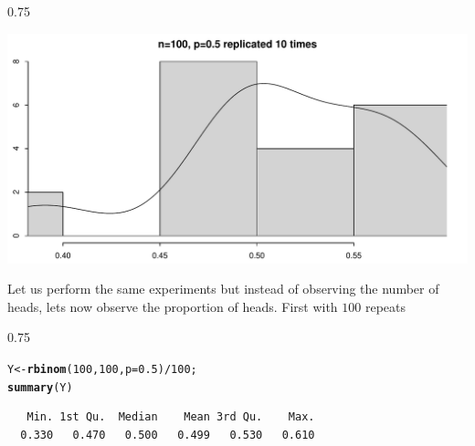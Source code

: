 \documentclass{beamer}\usepackage[]{graphicx}\usepackage[]{color}
\makeatletter
\newcommand{\hlnum}[1]{\textcolor[rgb]{0.2,0.2,0.2}{#1}}%
\newcommand{\hlopt}[1]{\textcolor[rgb]{0.102,0.102,0.102}{#1}}%
\newcommand{\hlstd}[1]{\textcolor[rgb]{0.102,0.102,0.102}{#1}}%
\newcommand{\hlkwb}[1]{\textcolor[rgb]{0.102,0.102,0.102}{#1}}%
\newcommand{\hlkwc}[1]{\textcolor[rgb]{0.2,0.2,0.2}{#1}}%
\newcommand{\hlkwd}[1]{\textcolor[rgb]{0.102,0.102,0.102}{\textbf{#1}}}%
\newenvironment{kframe}{%
 \def\at@end@of@kframe{}%
 \ifinner\ifhmode%
  \def\at@end@of@kframe{\end{minipage}}%
  \begin{minipage}{\columnwidth}%
 \fi\fi%
 \def\FrameCommand##1{\hskip\@totalleftmargin \hskip-\fboxsep
 \colorbox{shadecolor}{##1}\hskip-\fboxsep
     \hskip-\linewidth \hskip-\@totalleftmargin \hskip\columnwidth}%
 \MakeFramed {\advance\hsize-\width
   \@totalleftmargin\z@ \linewidth\hsize
   \@setminipage}}%
 {\par\unskip\endMakeFramed%
 \at@end@of@kframe}
\newenvironment{knitrout}{}{} %
\renewenvironment{knitrout}{\begin{spacing}{0.75}\begin{tiny}}{\end{tiny}\end{spacing}}
\makeatother
\begin{document}
\begin{frame}[fragile]

\begin{knitrout}\small
{}\color{fgcolor}

{\centering \includegraphics[width=0.89\linewidth]{figure/graphics-unnamed-chunk-9-1} 

}



\end{knitrout}

\end{frame}


\begin{frame}[fragile]

Let us perform the same experiments but instead of observing the number of heads, lets now observe the proportion of heads. First with $100$ repeats

\begin{knitrout}\small
{}\color{fgcolor}\begin{kframe}
\begin{alltt}
\hlstd{Y} \hlkwb{<-} \hlkwd{rbinom}\hlstd{(}\hlnum{100}\hlstd{,} \hlnum{100}\hlstd{,} \hlkwc{p}\hlstd{=}\hlnum{0.5}\hlstd{)}\hlopt{/} \hlnum{100}\hlstd{;}
\hlkwd{summary}\hlstd{(Y)}
\end{alltt}
\begin{verbatim}
   Min. 1st Qu.  Median    Mean 3rd Qu.    Max. 
  0.330   0.470   0.500   0.499   0.530   0.610 
\end{verbatim}
\end{kframe}
\end{knitrout}

\end{frame}
\end{document}
